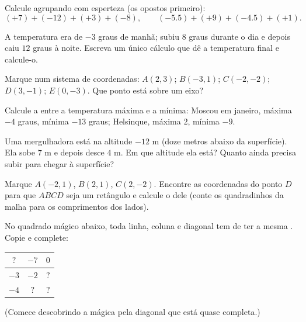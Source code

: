 \begin{exercise}[$\star$]\label{exo:g7:negatives:6}
Calcule agrupando com esperteza (os opostos primeiro):
\[
(+7) + (-12) + (+3) + (-8), \qquad
(-5.5) + (+9) + (-4.5) + (+1).
\]
\end{exercise}

\begin{exercise}[$\star$]\label{exo:g7:negatives:7}
A temperatura era de $-3$ graus de manhã; subiu $8$ graus durante o dia
e depois caiu $12$ graus à noite. Escreva um único cálculo que dê a
temperatura final e calcule-o.
\end{exercise}

\begin{exercise}[$\star$]\label{exo:g7:negatives:8}
Marque num sistema de coordenadas: $A(2, 3)$; $B(-3, 1)$; $C(-2, -2)$;
$D(3, -1)$; $E(0, -3)$. Que ponto está sobre um eixo?
\end{exercise}

\begin{exercise}[$\star\star$]\label{exo:g7:negatives:9}
Calcule a  entre a temperatura máxima e a mínima: Moscou em
janeiro, máxima $-4$ graus, mínima $-13$ graus; Helsinque, máxima $2$,
mínima $-9$.
\end{exercise}

\begin{exercise}[$\star\star$]\label{exo:g7:negatives:10}
Uma mergulhadora está na altitude $-12$ m (doze metros abaixo da
superfície). Ela sobe $7$ m e depois desce $4$ m. Em que altitude ela
está? Quanto ainda precisa subir para chegar à superfície?
\end{exercise}

\begin{exercise}[$\star\star$]\label{exo:g7:negatives:11}
Marque $A(-2, 1)$, $B(2, 1)$, $C(2, -2)$. Encontre as coordenadas do
ponto $D$ para que $ABCD$ seja um retângulo e calcule o  dele
(conte os quadradinhos da malha para os comprimentos dos lados).
\end{exercise}

\begin{exercise}[$\star\star\star$]\label{exo:g7:negatives:12}
No quadrado mágico abaixo, toda linha, coluna e diagonal tem de ter a
mesma . Copie e complete:
\begin{center}
\renewcommand{\arraystretch}{1.4}
\begin{tabular}{|c|c|c|}
\hline
$?$ & $-7$ & $0$ \\
\hline
$-3$ & $-2$ & $?$ \\
\hline
$-4$ & $?$ & $?$ \\
\hline
\end{tabular}
\end{center}
(Comece descobrindo a  mágica pela diagonal que está quase
completa.)
\end{exercise}

